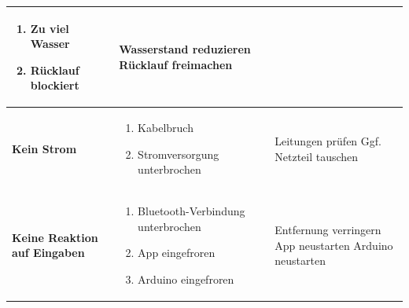 \begin{table}[h]
\begin{tabular}{|m{4.5cm}|m{5.2cm}|m{5cm}|}
\begin{enumerate}[nosep]
			\item Zu viel Wasser
			\item Rücklauf blockiert
		\end{enumerate}
		& Wasserstand reduzieren \newline Rücklauf freimachen \\
		\hline
		\textbf{Kein Strom} 
		& \begin{enumerate}[nosep]
			\item Kabelbruch
			\item Stromversorgung unterbrochen
		\end{enumerate}
		& Leitungen prüfen \newline Ggf. Netzteil tauschen \\
		\hline
		\textbf{Keine Reaktion auf Eingaben} 
		& \begin{enumerate}[nosep]
			\item Bluetooth-Verbindung unterbrochen
			\item App eingefroren
			\item Arduino eingefroren
		\end{enumerate}
		& Entfernung verringern \newline App neustarten \newline Arduino neustarten \\
		\hline
	\end{tabular}
\end{table}








